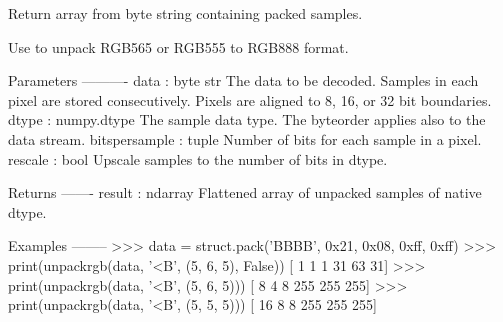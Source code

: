 \begin{DoxyVerb}Return array from byte string containing packed samples.

Use to unpack RGB565 or RGB555 to RGB888 format.

Parameters
----------
data : byte str
    The data to be decoded. Samples in each pixel are stored consecutively.
    Pixels are aligned to 8, 16, or 32 bit boundaries.
dtype : numpy.dtype
    The sample data type. The byteorder applies also to the data stream.
bitspersample : tuple
    Number of bits for each sample in a pixel.
rescale : bool
    Upscale samples to the number of bits in dtype.

Returns
-------
result : ndarray
    Flattened array of unpacked samples of native dtype.

Examples
--------
>>> data = struct.pack('BBBB', 0x21, 0x08, 0xff, 0xff)
>>> print(unpackrgb(data, '<B', (5, 6, 5), False))
[ 1  1  1 31 63 31]
>>> print(unpackrgb(data, '<B', (5, 6, 5)))
[  8   4   8 255 255 255]
>>> print(unpackrgb(data, '<B', (5, 5, 5)))
[ 16   8   8 255 255 255]\end{DoxyVerb}
 

